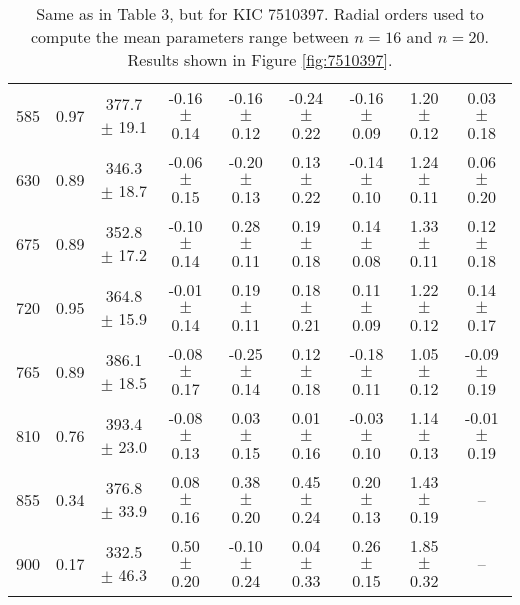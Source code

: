 \documentclass[twocolumn]{aastex61}%
\begin{document}
\begin{table*}[ht]
\begin{tabular}{ccc|ccccc|c}
585 & 0.97 & 377.7 $\pm$ 19.1 & -0.16 $\pm$ 0.14 & -0.16 $\pm$ 0.12 & -0.24 $\pm$ 0.22 & -0.16 $\pm$ 0.09 & 1.20 $\pm$ 0.12 & 0.03 $\pm$ 0.18\\
630 & 0.89 & 346.3 $\pm$ 18.7 & -0.06 $\pm$ 0.15 & -0.20 $\pm$ 0.13 & 0.13 $\pm$ 0.22 & -0.14 $\pm$ 0.10 & 1.24 $\pm$ 0.11 & 0.06 $\pm$ 0.20\\
675 & 0.89 & 352.8 $\pm$ 17.2 & -0.10 $\pm$ 0.14 & 0.28 $\pm$ 0.11 & 0.19 $\pm$ 0.18 & 0.14 $\pm$ 0.08 & 1.33 $\pm$ 0.11 & 0.12 $\pm$ 0.18\\
720 & 0.95 & 364.8 $\pm$ 15.9 & -0.01 $\pm$ 0.14 & 0.19 $\pm$ 0.11 & 0.18 $\pm$ 0.21 & 0.11 $\pm$ 0.09 & 1.22 $\pm$ 0.12 & 0.14 $\pm$ 0.17\\
765 & 0.89 & 386.1 $\pm$ 18.5 & -0.08 $\pm$ 0.17 & -0.25 $\pm$ 0.14 & 0.12 $\pm$ 0.18 & -0.18 $\pm$ 0.11 & 1.05 $\pm$ 0.12 & -0.09 $\pm$ 0.19\\
810 & 0.76 & 393.4 $\pm$ 23.0 & -0.08 $\pm$ 0.13 & 0.03 $\pm$ 0.15 & 0.01 $\pm$ 0.16 & -0.03 $\pm$ 0.10 & 1.14 $\pm$ 0.13 & -0.01 $\pm$ 0.19\\
855 & 0.34 & 376.8 $\pm$ 33.9 & 0.08 $\pm$ 0.16 & 0.38 $\pm$ 0.20 & 0.45 $\pm$ 0.24 & 0.20 $\pm$ 0.13 & 1.43 $\pm$ 0.19 & --\\
900 & 0.17 & 332.5 $\pm$ 46.3 & 0.50 $\pm$ 0.20 & -0.10 $\pm$ 0.24 & 0.04 $\pm$ 0.33 & 0.26 $\pm$ 0.15 & 1.85 $\pm$ 0.32 & --\\
\end{tabular}
\caption{Same as in Table 3, but for KIC 7510397. Radial orders used to compute the mean parameters range between $n=16$ and $n=20$. Results shown in Figure \ref{fig:7510397}.}\label{tab:7510397}
\end{table*}
\end{document}

